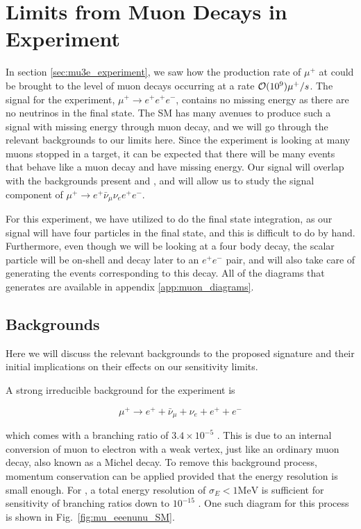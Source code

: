 \section{Limits from Muon Decays in \mueee Experiment}
In section \ref{sec:mu3e_experiment}, we saw how the production rate of $\mu^+$ at \mueee could be brought to the level of muon decays occurring at a rate $\operatorname{\mathcal{O}}(10^9) \mu^+/s$.
The signal for the \mueee experiment, $\mu^+ \rightarrow e^+ e^+ e^-$, contains no missing energy as there are no neutrinos in the final state.
The SM has many avenues to produce such a signal with missing energy through muon decay, and we will go through the relevant backgrounds to our limits here.
Since the experiment is looking at many muons stopped in a target, it can be expected that there will be many events that behave like a muon decay and have missing energy.
Our signal will overlap with the backgrounds present and \mueee, and will allow us to study the signal component of $\mu^+ \rightarrow e^+ \bar{\nu}_\mu \nu_e e^+ e^-$.

For this experiment, we have utilized \madgraph to do the final state integration, as our signal will have four particles in the final state, and this is difficult to do by hand.
Furthermore, even though we will be looking at a four body decay, the scalar particle will be on-shell and decay later to an $e^+ e^-$ pair, and \madgraph will also take care of generating the events corresponding to this decay.
All of the diagrams that \madgraph generates are available in appendix \ref{app:muon_diagrams}.

\subsection{Backgrounds}
Here we will discuss the relevant backgrounds to the proposed signature and their initial implications on their effects on our sensitivity limits.

A strong irreducible background for the experiment is

\begin{equation}
    \mu^+ \rightarrow e^+ + \bar{\nu}_\mu + \nu_e + e^+ + e^-
\end{equation}

\noindent which comes with a branching ratio of $3.4 \times 10^{-5}$ \cite{Agashe:2014kda}. 
This is due to an internal conversion of muon to electron with a weak vertex, just like an ordinary muon decay, also known as a Michel decay.
To remove this background process, momentum conservation can be applied provided that the energy resolution is small enough.
For \mueee, a total energy resolution of $\sigma_E < 1\textrm{MeV}$ is sufficient for sensitivity of branching ratios down to $10^{-15}$ \cite{Blondel:2013ia}.
One such diagram for this process is shown in Fig.\ \ref{fig:mu_eeenunu_SM}.

